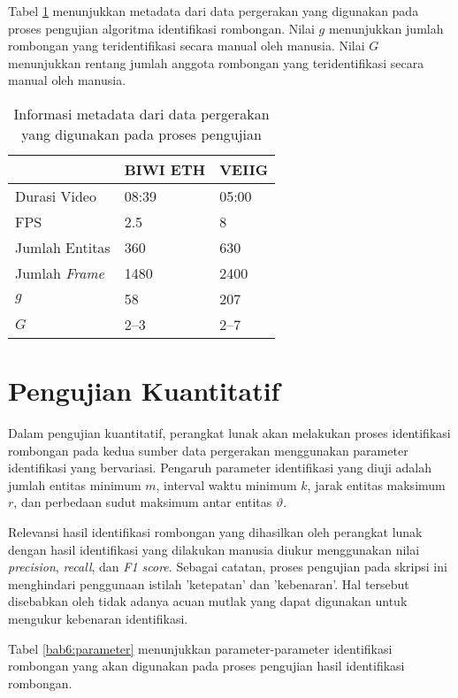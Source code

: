 Tabel \ref{bab6:metadata-pergerakan} menunjukkan metadata dari data pergerakan yang digunakan pada proses pengujian algoritma identifikasi rombongan. Nilai $g$ menunjukkan jumlah rombongan yang teridentifikasi secara manual oleh manusia. Nilai $G$ menunjukkan rentang jumlah anggota rombongan yang teridentifikasi secara manual oleh manusia.

\begin{table}[h]
    \centering
    \begin{tabular}{p{4cm} p{3cm} p{3cm}}
        \hline
        & \textbf{BIWI ETH} & \textbf{VEIIG} \\
        \hline
        Durasi Video & 08:39 & 05:00 \\
        FPS & 2.5 & 8 \\
        Jumlah Entitas & 360 & 630 \\
        Jumlah \textit{Frame} & 1480 & 2400 \\
        $g$ & 58 & 207 \\
        $G$ & 2--3 & 2--7 \\
        \hline
    \end{tabular}
    \caption[Metadata sumber data pergerakan]{Informasi metadata dari data pergerakan yang digunakan pada proses pengujian}
    \label{bab6:metadata-pergerakan}
\end{table}

\section{Pengujian Kuantitatif}
\label{sec:quantitative}

Dalam pengujian kuantitatif, perangkat lunak akan melakukan proses identifikasi rombongan pada kedua sumber data pergerakan menggunakan parameter identifikasi yang bervariasi. Pengaruh parameter identifikasi yang diuji adalah jumlah entitas minimum $m$, interval waktu minimum $k$, jarak entitas maksimum $r$, dan perbedaan sudut maksimum antar entitas $\vartheta$. 

Relevansi hasil identifikasi rombongan yang dihasilkan oleh perangkat lunak dengan hasil identifikasi yang dilakukan manusia diukur menggunakan nilai \textit{precision}, \textit{recall}, dan \textit{F1 score}. Sebagai catatan, proses pengujian pada skripsi ini menghindari penggunaan istilah 'ketepatan' dan 'kebenaran'. Hal tersebut disebabkan oleh tidak adanya acuan mutlak yang dapat digunakan untuk mengukur kebenaran identifikasi.

Tabel \ref{bab6:parameter} menunjukkan parameter-parameter identifikasi rombongan yang akan digunakan pada proses pengujian hasil identifikasi rombongan.

